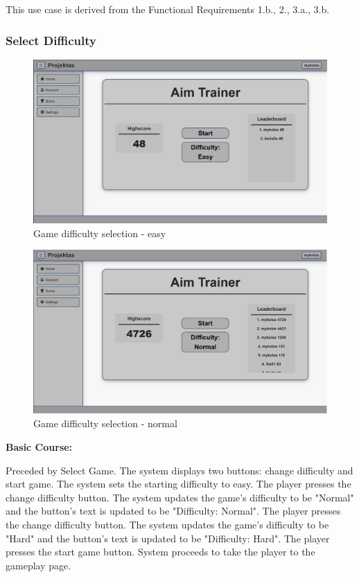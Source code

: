 \documentclass[11pt,a4paper]{article}
\newcommand{\heading}[1]{\vspace{1em}\noindent\textbf{#1}\par\vspace{0.5em}}
\begin{document}
This use case is derived from the Functional Requirements 1.b., 2., 3.a., 3.b.

\subsubsection{Select Difficulty}

\begin{figure}[H]
    \centering
    \includegraphics[width=1\textwidth,keepaspectratio]{PSI_3rd_trial/PNGs/select_difficulty.png}
    \caption{Game difficulty selection - easy}
    \label{fig:select_difficulty}
\end{figure}

\begin{figure}[H]
    \centering
    \includegraphics[width=1\textwidth,keepaspectratio]{PSI_3rd_trial/PNGs/select_difficulty_2.png}
    \caption{Game difficulty selection - normal}
    \label{fig:select_difficulty_2}
\end{figure}

\heading{Basic Course:}

Preceded by Select Game. The system displays two buttons: change difficulty and start game. The system sets the starting difficulty to easy. The player presses the change difficulty button. The system updates the game's difficulty to be "Normal" and the button's text is updated to be "Difficulty: Normal". The player presses the change difficulty button. The system updates the game's difficulty to be "Hard" and the button's text is updated to be "Difficulty: Hard". The player presses the start game button. System proceeds to take the player to the gameplay page.
\end{document}

